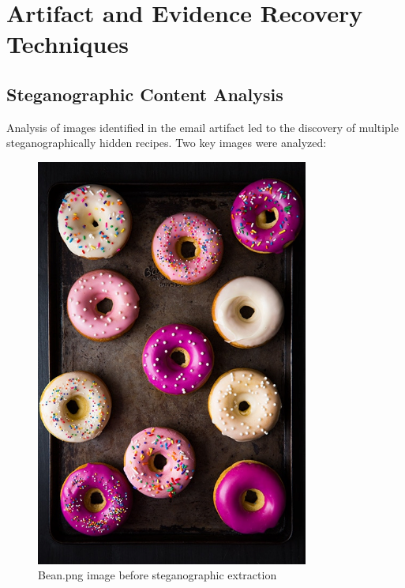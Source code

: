 \chapter{Artifact and Evidence Recovery Techniques}

\section{Steganographic Content Analysis}
Analysis of images identified in the email artifact led to the discovery of multiple steganographically hidden recipes. Two key images were analyzed:

\begin{figure}[htbp]
    \centering
    \includegraphics[width=0.8\textwidth]{images/Artifact and Evidence Recovery/bean_recipe.png}
    \caption{Bean.png image before steganographic extraction}
    \label{fig:bean_image}
\end{figure}

